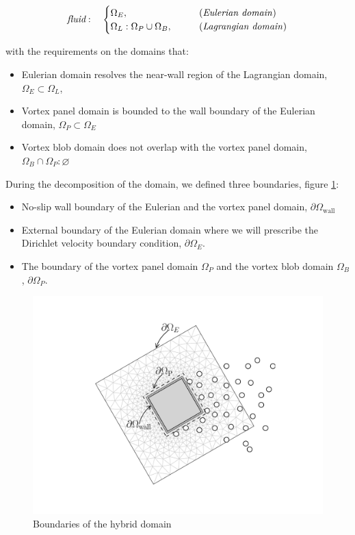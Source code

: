 	\begin{equation}
	\textit{fluid}:\quad\begin{cases}
	\Omega_E, &\qquad \text{(\textit{Eulerian domain})}  \\
	\Omega_L: \Omega_{P} \cup \Omega_B, &\qquad \text{(\textit{Lagrangian domain})}
	  \end{cases}
	\end{equation}

with the requirements on the domains that:
	\begin{itemize}
	\item Eulerian domain resolves the near-wall region of the Lagrangian domain, $\Omega_E \subset \Omega_L$,
	\item Vortex panel domain is bounded to the wall boundary of the Eulerian domain, $\Omega_P \subset \Omega_E$
	\item Vortex blob domain does not overlap with the vortex panel domain, $\Omega_B \cap \Omega_P : \varnothing$
	\end{itemize}

During the decomposition of the domain, we defined three boundaries, figure \ref{fig:hybrid_config}:
\begin{itemize}
\item No-slip wall boundary of the Eulerian and the vortex panel domain, $\partial \Omega_{\mathrm{wall}}$
\item External boundary of the Eulerian domain where we will prescribe the Dirichlet velocity boundary condition, $\partial \Omega_{E}$.
\item The boundary of the vortex panel domain $\Omega_P$ and the vortex blob domain $\Omega_B$, $\partial \Omega_P$.
\end{itemize}	

	\begin{figure}[t]
	\centering
	\includegraphics[trim=3.9cm 1.6cm 3.3cm 1.6cm, clip,  width=0.5\linewidth]{./figures/hybrid/interpolation/hybrid.pdf}
	\caption{Boundaries of the hybrid domain}
	\label{fig:hybrid_config}
	\end{figure}	

